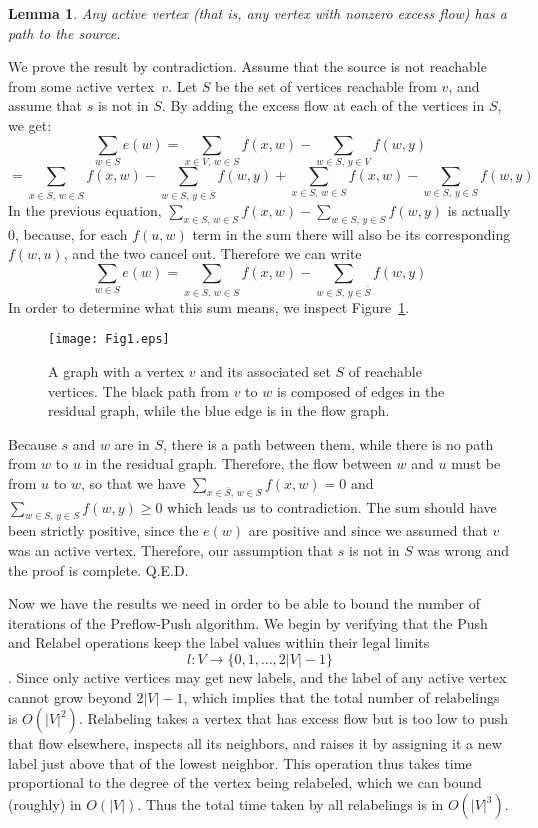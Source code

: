 \documentclass{article}
\newtheorem{lemma}{Lemma}
\newcommand{\QED}{\hfill\hbox{\sf Q.E.D.}}
\newenvironment{proof}{\noindent {\bf Proof:}}{{\QED}\\ \vspace{-.1in}}
\begin{document}
\begin{lemma}
  Any active vertex (that is, any vertex with nonzero excess flow)
  has a path to the source.
\end{lemma}
\begin{proof}
  We prove the result by contradiction. Assume that the source is not
  reachable from some active vertex~$v$.  Let $S$ be the set of vertices
  reachable from $v$, and assume that $s$ is not in $S$. By adding the excess
  flow at each of the vertices in $S$, we get:
    $$\sum_{w\in S} e(w) = \sum_{x\in V,\,w\in S} f(x,w) - \sum_{w\in S,\,y\in V} f(w,y)$$
$$=
      \sum_{x\in\bar{S},\,w\in S} f(x,w) - \sum_{w\in S,\,y\in \bar{S}} f(w,y) + 
\sum_{x\in S,\,w\in S} f(x,w) - \sum_{w\in S,\,y\in S} f(w,y)$$
  In the previous equation, $\sum_{x\in S,\,w\in S} f(x,w) - \sum_{w\in S,\,y\in S} f(w,y)$ is actually 0,
  because, for each $f(u,w)$ term in the sum there will also be its
  corresponding $f(w,u)$, and the two cancel out.  Therefore we can write
    $$\sum_{w\in S} e(w) = \sum_{x\in\bar{S},\,w\in S} f(x,w) - \sum_{w\in S,\,y\in \bar{S}} f(w,y)$$
  In order to determine what this sum means, we inspect Figure~\ref{fig:Fig1}.
  \begin{figure}[t]%
    \centering
    \texttt{[image: Fig1.eps]}%
    \caption{A graph with a vertex $v$ and its associated set $S$ of reachable
    vertices. The black path from $v$ to $w$ is composed of edges in the
    residual graph, while the blue edge is in the flow graph.}%
    \label{fig:Fig1}%
  \end{figure}%
  Because $s$ and $w$ are in $S$, there is a path between them, while there is
  no path from $w$ to $u$ in the residual graph.  Therefore, the flow
  between $w$ and $u$ must be from $u$ to $w$, so that we have 
$\sum_{x\in\bar{S},\,w\in S} f(x,w) = 0$ and $\sum_{w\in S,\,y\in S} f(w,y) \geq 0$
 which leads us to contradiction.
  The sum should have been strictly positive, since the $e(w)$ are positive
  and since we assumed that $v$ was an active vertex.
  Therefore, our assumption that $s$ is not in $S$ was wrong and the proof
  is complete.
\end{proof}

Now we have the results we need in order to be able to bound the number of
iterations of the Preflow-Push algorithm. We begin by verifying that the Push
and Relabel operations keep the label values within their legal limits
  $$l\colon V\to\{0,1,\ldots,2|V|-1\}$$.
Since only active vertices may get new labels, and the label of any active vertex 
cannot grow beyond $2|V|-1$, which
implies that the total number of relabelings is $O(|V|^2)$.
Relabeling  takes a vertex that has excess flow but is too low to push
that flow elsewhere, inspects all its neighbors, and raises it by assigning
it a new label just above that of the lowest neighbor.  This operation
thus takes time proportional to the degree of the vertex being relabeled,
which we can bound (roughly) in $O(|V|)$.
Thus the total time taken by all relabelings is in $O(|V|^3)$.
\end{document}
